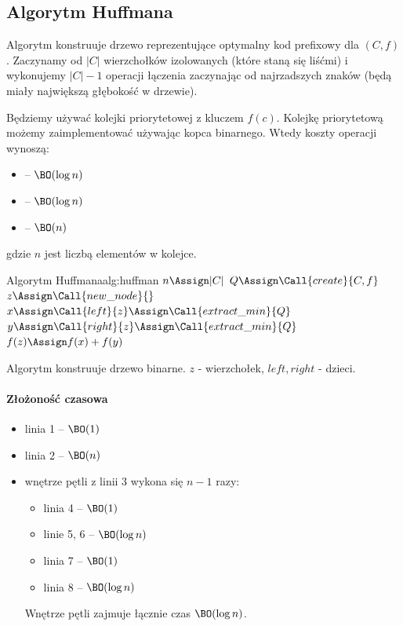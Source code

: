 \subsection{Algorytm Huffmana}

Algorytm konstruuje drzewo reprezentujące optymalny kod prefixowy dla $(C, f)$.
Zaczynamy od $|C|$ wierzchołków izolowanych (które staną się liśćmi) i wykonujemy $|C|-1$ operacji łączenia zaczynając od najrzadszych znaków (będą miały największą głębokość w drzewie).

Będziemy używać kolejki priorytetowej z kluczem $f(c)$. Kolejkę priorytetową możemy zaimplementować używając kopca binarnego. Wtedy koszty operacji wynoszą:
\begin{itemize}[nosep]
	\item {} -- $\BO(\log n)$
	\item {} -- $\BO(\log n)$
	\item {} -- $\BO(n)$
\end{itemize}
gdzie $n$ jest liczbą elementów w kolejce.

\begin{alg}{Algorytm Huffmana}{alg:huffman}
	\State $n \Assign |C|$
	\State $Q \Assign \Call{create}{C, f}$ 
	\State $z \Assign \Call{new\_node}{}$
	\State $x \Assign \Call{left}{z} \Assign \Call{extract\_min}{Q}$
	\State $y \Assign \Call{right}{z} \Assign \Call{extract\_min}{Q}$
	\State $f(z) \Assign f(x) + f(y)$
	\State {}
	\EndFor
	\State \Return {}
	\EndFunction
\end{alg}
Algorytm konstruuje drzewo binarne. $z$ - wierzchołek, $left, right$ - dzieci.

\paragraph{Złożoność czasowa}
\begin{itemize}[nosep]
	\item linia 1 -- $\BO(1)$
	\item linia 2 -- $\BO(n)$
	\item wnętrze pętli z linii 3 wykona się $n - 1$ razy:
	\begin{itemize}[nosep]
		\item linia 4 -- $\BO(1)$
		\item linie 5, 6 -- $\BO(\log n)$
		\item linia 7 -- $\BO(1)$
		\item linia 8 -- $\BO(\log n)$
	\end{itemize}
	Wnętrze pętli zajmuje łącznie czas $\BO(\log n)$.
\end{itemize}

